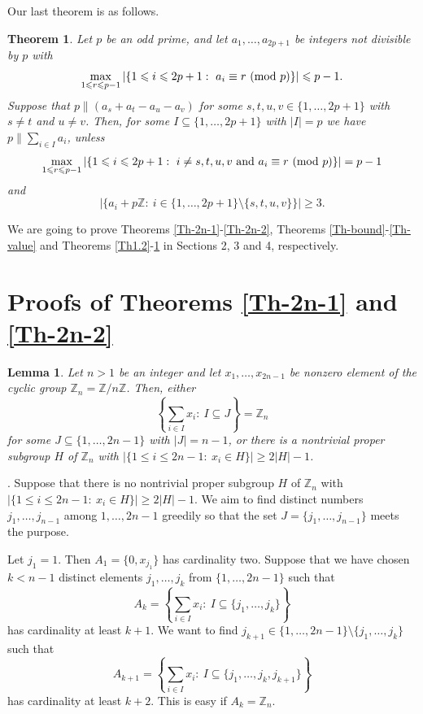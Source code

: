 \documentclass[11pt,reqno]{amsart}
\def\pmod #1{\ ({\rm{mod}}\ #1)}
\def\Z{\mathbb Z}
\def\l{\left}
\def\r{\right}
\def\t{\text}
\def\ls{\leqslant}
\def\gs{\geqslant}
\def\se {\subseteq}
\def\sm{\setminus}
\def\eq{\equiv}
\def\Proof{\noindent{\it Proof}}
\theoremstyle{plain}
\newtheorem{theorem}{Theorem}
\newtheorem{lemma}{Lemma}
\theoremstyle{definition}
\theoremstyle{remark}
\begin{document}
Our last theorem is as follows.

\begin{theorem}\label{Th1.3} Let $p$ be an odd prime, and let $a_1,\ldots,a_{2p+1}$
be integers not divisible by $p$ with
$$\max_{1\ls r\ls p-1}|\{1\ls i\ls 2p+1:\ a_i\eq r\pmod p\}|\ls p-1.$$
Suppose that $p\|(a_s+a_t-a_u-a_v)$ for some $s,t,u,v\in\{1,\ldots,2p+1\}$ with $s\not=t$ and $u\not=v$. Then, for some $I\se\{1,\ldots,2p+1\}$ with $|I|=p$ we have $p\|\sum_{i\in I}a_i$,
unless
$$\max_{1\ls r\ls p-1}|\{1\ls i\ls 2p+1:\ i\not=s,t,u,v\ \t{and}\ a_i\eq r\pmod p\}|=p-1$$
and
$$|\{a_i+p\Z:\ i\in\{1,\ldots,2p+1\}\sm\{s,t,u,v\}\}|\gs3.$$
\end{theorem}

We are going to prove Theorems \ref{Th-2n-1}-\ref{Th-2n-2}, Theorems \ref{Th-bound}-\ref{Th-value} and
Theorems \ref{Th1.2}-\ref{Th1.3} in Sections 2, 3 and 4, respectively.

\section{Proofs of Theorems \ref{Th-2n-1} and \ref{Th-2n-2}}
\setcounter{lemma}{0}
\setcounter{theorem}{0}
\setcounter{corollary}{0}
\setcounter{remark}{0}
\setcounter{equation}{0}

\begin{lemma} \label{Lem-H} Let $n>1$ be an integer and let $x_1,\ldots,x_{2n-1}$
be nonzero element of the cyclic group $\Z_n=\Z/n\Z$. Then, either
$$\l\{\sum_{i\in I}x_i:\ I\se J\r\}=\Z_n$$
for some $J\se\{1,\ldots,2n-1\}$ with $|J|=n-1$, or there is a nontrivial proper subgroup
$H$ of $\Z_n$ with $|\{1\ls i\ls 2n-1:\ x_i\in H\}|\gs 2|H|-1$.
\end{lemma}
\Proof. Suppose that there is no nontrivial proper subgroup
$H$ of $\Z_n$ with $|\{1\ls i\ls 2n-1:\ x_i\in H\}|\gs 2|H|-1$.
We aim to find distinct numbers $j_1,\ldots,j_{n-1}$
among $1,\ldots,2n-1$ greedily so that the set $J=\{j_1,\ldots,j_{n-1}\}$ meets the purpose.

Let $j_1=1$. Then $A_1=\{0,x_{j_1}\}$ has cardinality two.
Suppose that we have chosen  $k<n-1$ distinct elements $j_1,\ldots,j_k$ from $\{1,\ldots,2n-1\}$
such that
$$A_k=\l\{\sum_{i\in I}x_{i}:\ I\se\{j_1,\ldots,j_k\}\r\}$$
has cardinality at least $k+1$.
We want to find $j_{k+1}\in\{1,\ldots,2n-1\}\sm \{j_1,\ldots,j_k\}$
such that
$$A_{k+1}=\l\{\sum_{i\in I}x_{i}:\ I\se\{j_1,\ldots,j_k,j_{k+1}\}\r\}$$
has cardinality at least $k+2$.
This is easy if $A_k=\Z_n$.
\end{document}
